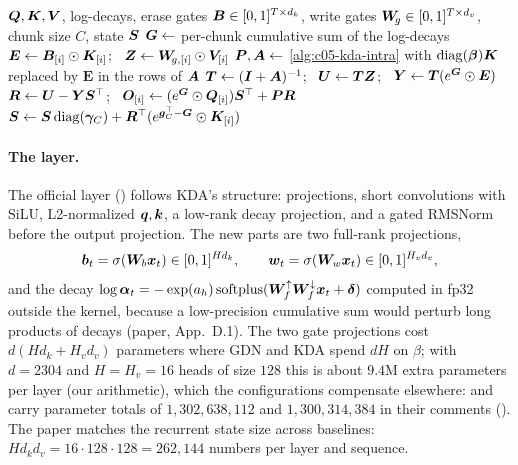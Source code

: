 \begin{algorithm}[t]
\caption{GDN-2 chunkwise forward, one head (changes relative to KDA marked $\star$)}
\label{alg:c05-gdn2}
\begin{algorithmic}[1]
\Require $\bm{Q},\bm{K},\bm{V}$, log-decays, erase gates $\bm{B} \in [0,1]^{T\times d_k}$, write gates
  $\bm{W}_{\!g} \in [0,1]^{T\times d_v}$, chunk size $C$, state $\bm{S}$
  \State $\bm{G} \gets$ per-chunk cumulative sum of the log-decays
  \State $\bm E \gets \bm{B}_{[i]}\odot\bm{K}_{[i]}$; \ $\bm{Z} \gets \bm{W}_{\!g,[i]}\odot\bm{V}_{[i]}$ \Comment{$\star$}
  \State $\bm{P}, \bm{A} \gets$ \cref{alg:c05-kda-intra} with $\operatorname{diag}(\bm{\beta})\bm{K}$ replaced by $\bm E$ in the
         rows of $\bm{A}$ \Comment{$\star$}
  \State $\bm{T} \gets (\bm{I}+\bm{A})^{-1}$; \ $\bm{U} \gets \bm{T}\bm{Z}$; \ $\bm{Y} \gets \bm{T}(e^{\bm{G}}\odot\bm E)$
         \Comment{$\star$}
\EndFor
{} 
  \State $\bm R \gets \bm{U} - \bm{Y}\bm{S}^{\top}$; \ $\bm{O}_{[i]} \gets (e^{\bm{G}}\odot\bm{Q}_{[i]})\bm{S}^{\top} + \bm{P}\bm R$
  \State $\bm{S} \gets \bm{S}\operatorname{diag}(\bm\gamma_C) + \bm R^{\top}(e^{\bm{g}_C^{\top} - \bm{G}}\odot\bm{K}_{[i]})$
\EndFor
\end{algorithmic}
\end{algorithm}

\paragraph{The layer.} The official layer 
() follows KDA's structure: projections,
short convolutions with SiLU, L2-normalized $\bm{q},\bm{k}$, a low-rank decay projection, and a gated
RMSNorm before the output projection. The new parts are two full-rank projections,
\begin{equation}\label{eq:c05-gdn2-gates}
  \bm{b}_t = \sigma(\bm{W}_b\bm{x}_t) \in [0,1]^{Hd_k},\qquad \bm{w}_t = \sigma(\bm{W}_w\bm{x}_t) \in [0,1]^{H_vd_v},
\end{equation}
and the decay $\log\bm{\alpha}_t = -\exp(a_h)\,\mathrm{softplus}(\bm{W}_f^{\uparrow}\bm{W}_f^{\downarrow}\bm{x}_t +
\bm\delta)$ computed in fp32 outside the kernel, because a low-precision cumulative sum would
perturb long products of decays (paper, App.~D.1). The two gate projections cost
$d(Hd_k + H_vd_v)$ parameters where GDN and KDA spend $dH$ on $\beta$; with $d = 2304$ and
$H = H_v = 16$ heads of size $128$ this is about $9.4$M extra parameters per layer (our
arithmetic), which the configurations compensate elsewhere:  and
 carry parameter totals of $1{,}302{,}638{,}112$ and $1{,}300{,}314{,}384$ in
their comments (). The paper matches the
recurrent state size across baselines: $H d_k d_v = 16\cdot128\cdot128 = 262{,}144$ numbers per
layer and sequence.

